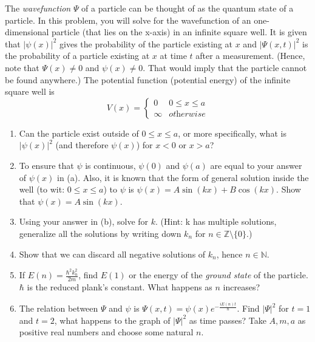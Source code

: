 \begin{problem}[2]
  The \textit{wavefunction} \(\Psi\) of a particle can be thought of as the quantum state of a particle. In this problem, you will solve for the wavefunction of an one-dimensional particle (that lies on the x-axis) in an infinite square well. It is given that \(|\psi(x)|^2\) gives the probability of the particle existing at \(x\) and \(|\Psi(x,t)|^2\) is the probability of a particle existing at \(x\) at time \(t\) after a measurement. (Hence, note that \(\Psi(x)\neq 0\) and \(\psi(x)\neq 0\). That would imply that the particle cannot be found anywhere.) The potential function (potential energy) of the infinite square well is
  \begin{equation}
    V(x) = \begin{cases}
      0 & 0\leq x\leq a \\
      \infty & \textit{otherwise}
    \end{cases}
  \end{equation}
  \begin{enumerate}[label=\alph*)]
    \item{Can the particle exist outside of \(0\leq x\leq a\), or more specifically, what is \(|\psi(x)|^2\) (and therefore \(\psi(x)\)) for \(x<0\) or \(x>a\)?}
    \item{To ensure that \(\psi\) is continuous, \(\psi(0)\) and \(\psi(a)\) are equal to your answer of \(\psi(x)\) in (a). Also, it is known that the form of general solution inside the well (to wit: \(0\leq x\leq a\)) to \(\psi\) is \(\psi(x)=A\sin(kx)+B\cos(kx)\). Show that \(\psi(x)=A\sin(kx)\).}
    \item{Using your answer in (b), solve for \(k\). (Hint: k has multiple solutions, generalize all the solutions by writing down \(k_n\) for \(n\in \mathbb{Z}\setminus\{0\}\).)}
    \item{Show that we can discard all negative solutions of \(k_n\), hence \(n\in \mathbb{N}\).}
    \item{If \(E(n)=\frac{\hbar^2 k_n^2}{2m}\), find \(E(1)\) or the energy of the \textit{ground state} of the particle. \(\hbar\) is the reduced plank's constant. What happens as \(n\) increases?}
    \item{The relation between \(\Psi\) and \(\psi\) is \(\Psi(x,t)=\psi(x)e^{-\frac{iE(n)t}{\hbar}}\). Find \(|\Psi|^2\) for \(t=1\) and \(t=2\), what happens to the graph of \(|\Psi|^2\) as time passes? Take \(A, m, a\) as positive real numbers and choose some natural \(n\).}
  \end{enumerate}
  \label{infinitewell}
\end{problem}
